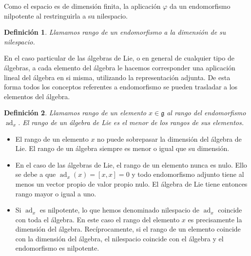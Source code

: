 \documentclass[a4paper,draft,12pt]{article}
\newtheorem{defi}{Definición}[section]%
\newcommand{\g}{\mathfrak{g}}%
\newcommand{\df}[1]{\textsf{\color{blue}#1}}
\DeclareMathOperator{\ad}{ad}  %
\begin{document}
Como el espacio es de dimensión finita, la aplicación $\varphi$ da un endomorfismo nilpotente al restringuirla a su nilespacio.

\begin{defi}

Llamamos  \df{rango} de un endomorfismo a la dimensión de su nilespacio.

\end{defi}

En el caso particular de las álgebras de Lie, o en general de cualquier tipo de álgebras, a cada elemento del álgebra le hacemos corresponder una aplicación lineal del álgebra en si misma, utilizando la representación adjunta.  De esta forma todos los conceptos referentes a endomorfismo se pueden trasladar a los elementos del álgebra.

\begin{defi}

Llamamos  \df{rango}  de un elemento $x \in \g$ al rango del endomorfismo $\ad_x$.  El  \df{rango} de un álgebra de Lie es el menor de los rangos de sus elementos.

\end{defi}



\begin{itemize}

\item  El rango de un elemento $x$ no puede sobrepasar la dimensión del álgebra de Lie.  El rango de un álgebra siempre es menor o igual que su dimensión.

\item  En el caso de las álgebras de Lie, el rango de un elemento nunca es nulo.  Ello se debe a que $\ad_x(x)= [x,x]=0$ y todo endomorfismo adjunto tiene al menos un vector propio de valor propio nulo.  El álgebra de Lie tiene entonces rango mayor o igual a uno.

\item  Si $\ad_x$ es nilpotente, lo que hemos denominado nilespacio de $\ad_x$ coincide con toda el álgebra.  En este caso el rango del elemento $x$ es precisamente la dimensión del álgebra.  Recíprocamente, si el rango de un elemento coincide con la dimensión del álgebra, el nilespacio coincide con el álgebra y el endomorfismo es nilpotente.



\end{itemize}
\end{document}
